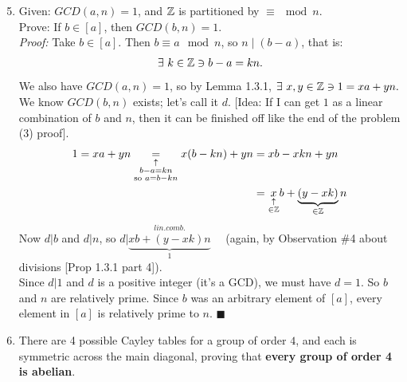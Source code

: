 \begin{enumerate}
    \setcounter{enumi}{4} %

    \item Given: $GCD(a, n) = 1$, and ${\mathbb{Z}}$ is partitioned by $\equiv \mod n$.  \\
          Prove: If $b \in [a]$, then $GCD(b, n) = 1$. \\

          \textit{Proof:}  
          Take $b \in [a]$. Then $b \equiv a \mod{n}$, so $n \mid (b - a)$, that is:
          \[
          \exists \ k \in {\mathbb{Z}} \ni b - a = kn.
          \]
          We also have $GCD(a, n) = 1$, so by Lemma 1.3.1, $\exists \ x, y \in {\mathbb{Z}} \ni 1 = xa + yn.$ \\
          We know $GCD(b, n)$ exists; let's call it $d$. [Idea: If I can get $1$ as a linear combination of $b$ and $n$, then it can be finished off like the end of the problem (3) proof]. 
          \begin{align*}
            1 = xa+yn \underset{\substack{\uparrow \\ b-a=kn \\ \text{so }a=b-kn}}{=} x(b-kn)+yn &= xb-xkn+yn \\
            &= \underset{\substack{\uparrow \\ \in {\mathbb{Z}}}}{x}b+ \underbrace{(y-xk)}_{\in {\mathbb{Z}}}n
          \end{align*}
          Now $d|b$ and $d|n$, so $d| \underbrace{\overset{\substack{lin. comb.}}{xb+(y-xk)n}}_{1}$ \ \ (again, by Observation \#4 about divisions [Prop 1.3.1 part 4]). \\
          Since $d|1$ and $d$ is a positive integer (it's a GCD), we must have $d = 1$. So $b$ and $n$ are relatively prime. Since $b$ was an arbitrary element of $[a]$, every element in $[a]$ is relatively prime to $n$. $\blacksquare$

    \item There are 4 possible Cayley tables for a group of order $4$, and each is symmetric across the main diagonal, proving that \textbf{every group of order 4 is abelian}.


\end{enumerate}
